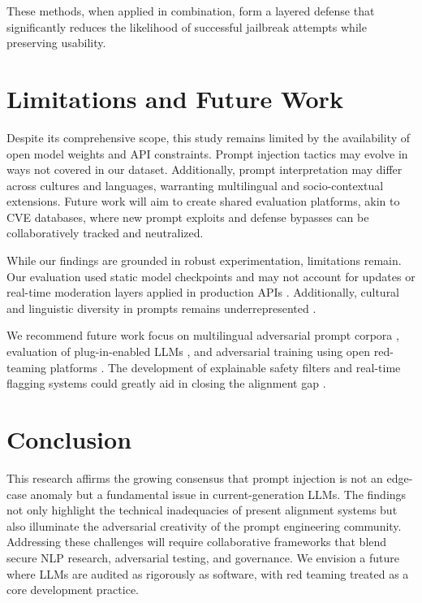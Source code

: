 \documentclass[conference]{IEEEtran}
\begin{document}
These methods, when applied in combination, form a layered defense that significantly reduces the likelihood of successful jailbreak attempts while preserving usability.

\section{Limitations and Future Work}

Despite its comprehensive scope, this study remains limited by the availability of open model weights and API constraints. Prompt injection tactics may evolve in ways not covered in our dataset. Additionally, prompt interpretation may differ across cultures and languages, warranting multilingual and socio-contextual extensions. Future work will aim to create shared evaluation platforms, akin to CVE databases, where new prompt exploits and defense bypasses can be collaboratively tracked and neutralized.

While our findings are grounded in robust experimentation, limitations remain. Our evaluation used static model checkpoints and may not account for updates or real-time moderation layers applied in production APIs \cite{liu2024automatic3}\cite{technicalreport17}. Additionally, cultural and linguistic diversity in prompts remains underrepresented \cite{liang2023holistic25}\cite{bender2021danger35}.

We recommend future work focus on multilingual adversarial prompt corpora \cite{liang2023holistic25}, evaluation of plug-in-enabled LLMs \cite{wang2024poisoned44}, and adversarial training using open red-teaming platforms \cite{jacob2025promptshield21}\cite{hung2025attentiontracker8}\cite{lin2025uniguardianunified13}. The development of explainable safety filters and real-time flagging systems could greatly aid in closing the alignment gap \cite{chen2025secaligndefend11}\cite{anthropicjail18}\cite{suo2024signedprompt41}.

\section{Conclusion}

This research affirms the growing consensus that prompt injection is not an edge-case anomaly but a fundamental issue in current-generation LLMs. The findings not only highlight the technical inadequacies of present alignment systems but also illuminate the adversarial creativity of the prompt engineering community. Addressing these challenges will require collaborative frameworks that blend secure NLP research, adversarial testing, and governance. We envision a future where LLMs are audited as rigorously as software, with red teaming treated as a core development practice.
\end{document}
